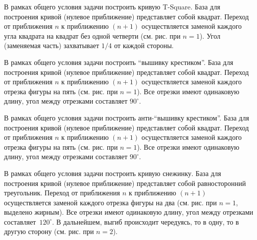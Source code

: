
\begin{zztask}
В рамках общего условия задачи построить кривую T-Square.
База для построения кривой (нулевое приближение) представляет собой квадрат.
Переход от приближения $n$ к приближению $(n+1)$ осуществляется заменой каждого 
угла квадрата на квадрат без одной четверти (см. рис. при $n=1$). 
Угол (заменяемая часть) захватывает $1/4$ от каждой стороны.
\par
\end{zztask}


\begin{zztask}
В рамках общего условия задачи построить ``вышивку крестиком''.
База для построения кривой (нулевое приближение) представляет собой квадрат.
Переход от приближения $n$ к приближению $(n+1)$ осуществляется заменой каждого 
отрезка фигуры на пять (см. рис. при $n=1$). 
Все отрезки имеют одинаковую длину, угол между отрезками составляет $90^\circ$.
\par
\end{zztask}


\begin{zztask}
В рамках общего условия задачи построить анти-``вышивку крестиком''.
База для построения кривой (нулевое приближение) представляет собой квадрат.
Переход от приближения $n$ к приближению $(n+1)$ осуществляется заменой каждого 
отрезка фигуры на пять (см. рис. при $n=1$). 
Все отрезки имеют одинаковую длину, угол между отрезками составляет $90^\circ$.
\par
\end{zztask}


\begin{zztask}
В рамках общего условия задачи построить кривую снежинку. База для построения
кривой (нулевое приближение) представляет собой равносторонний треугольник.
Переход от приближения
$n$ к приближению $(n+1)$ осуществляется заменой каждого отрезка фигуры на два
(см. рис. при $n=1$, выделено жирным). Все отрезки
имеют одинаковую длину, угол между отрезками \mbox{составляет $120^\circ$}.
В дальнейшем, выгиб происходит чередуясь, то в одну, то в другую сторону 
(см. рис. при $n=2$).
\par
\end{zztask}


